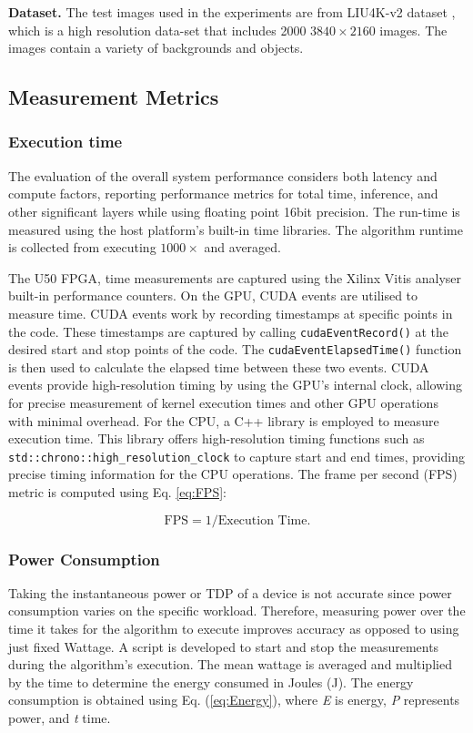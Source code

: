 \documentclass[]{spie}  %
\begin{document}
\textbf{Dataset.} The test images used in the experiments are from LIU4K-v2 dataset \cite{LiuliuYan19}, which is a high resolution data-set that includes 2000 $3840\times2160$ images. The images contain a variety of backgrounds and objects. 


\subsection{Measurement Metrics}
\subsubsection{Execution time}
The evaluation of the overall system performance considers both latency and compute factors, reporting performance metrics for total time, inference, and other significant layers while using floating point 16bit precision. The run-time is measured using the host platform's built-in time libraries. The algorithm runtime is collected from executing $1000\times$ and averaged.  

The U50 FPGA, time measurements are captured using the Xilinx Vitis analyser built-in performance counters. On the GPU, CUDA events are utilised to measure time. CUDA events work by recording timestamps at specific points in the code. These timestamps are captured by calling \verb|cudaEventRecord()| at the desired start and stop points of the code. The \verb|cudaEventElapsedTime()| function is then used to calculate the elapsed time between these two events. CUDA events provide high-resolution timing by using the GPU's internal clock, allowing for precise measurement of kernel execution times and other GPU operations with minimal overhead. For the CPU, a C++ library is employed to measure execution time. This library offers high-resolution timing functions such as \verb|std::chrono::high_resolution_clock| to capture start and end times, providing precise timing information for the CPU operations. The frame per second (FPS) metric is computed using Eq. \ref{eq:FPS}: 

\begin{equation}\label{eq:FPS}
\text{FPS}= 1/\text{Execution Time}.
\end{equation}

\subsubsection{Power Consumption}

Taking the instantaneous power or TDP of a device is not accurate since power consumption varies on the specific workload. Therefore, measuring power over the time it takes for the algorithm to execute improves accuracy as opposed to using just fixed Wattage. A script is developed to start and stop the measurements during the algorithm's execution. The mean wattage is averaged and multiplied by the time to determine the energy consumed in Joules (J). The energy consumption is obtained using Eq. (\ref{eq:Energy}), where \textit{E} is energy, \textit{P} represents power, and \textit{t} time.
\end{document}
